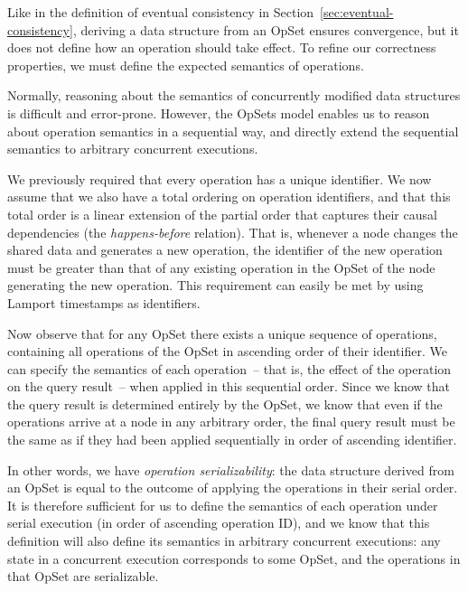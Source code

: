 Like in the definition of eventual consistency in Section~\ref{sec:eventual-consistency}, deriving a data structure from an OpSet ensures convergence, but it does not define how an operation should take effect.
To refine our correctness properties, we must define the expected semantics of operations.

Normally, reasoning about the semantics of concurrently modified data structures is difficult and error-prone.
However, the OpSets model enables us to reason about operation semantics in a sequential way, and directly extend the sequential semantics to arbitrary concurrent executions.

We previously required that every operation has a unique identifier.
We now assume that we also have a total ordering on operation identifiers, and that this total order is a linear extension of the partial order that captures their causal dependencies (the \emph{happens-before} relation).
That is, whenever a node changes the shared data and generates a new operation, the identifier of the new operation must be greater than that of any existing operation in the OpSet of the node generating the new operation.
This requirement can easily be met by using Lamport timestamps \cite{Lamport:1978jq} as identifiers.

Now observe that for any OpSet there exists a unique sequence of operations, containing all operations of the OpSet in ascending order of their identifier.
We can specify the semantics of each operation~-- that is, the effect of the operation on the query result~-- when applied in this sequential order.
Since we know that the query result is determined entirely by the OpSet, we know that even if the operations arrive at a node in any arbitrary order, the final query result must be the same as if they had been applied sequentially in order of ascending identifier.

In other words, we have \emph{operation serializability}: the data structure derived from an OpSet is equal to the outcome of applying the operations in their serial order.
It is therefore sufficient for us to define the semantics of each operation under serial execution (in order of ascending operation ID), and we know that this definition will also define its semantics in arbitrary concurrent executions: any state in a concurrent execution corresponds to some OpSet, and the operations in that OpSet are serializable.
